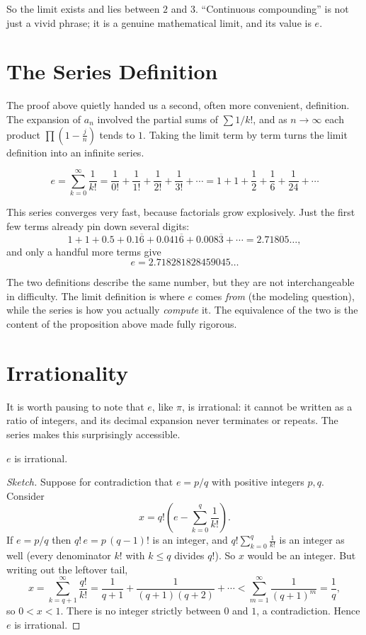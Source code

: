 \documentclass{essay}
\begin{document}
So the limit exists and lies between \(2\) and \(3\). ``Continuous compounding'' is not just a vivid phrase; it is a genuine mathematical limit, and its value is \(e\).

\section{The Series Definition}

The proof above quietly handed us a second, often more convenient, definition. The expansion of \(a_{n}\) involved the partial sums of \(\sum 1/k!\), and as \(n \to \infty\) each product \(\prod\left(1 - \tfrac{j}{n}\right)\) tends to \(1\). Taking the limit term by term turns the limit definition into an infinite series.

\begin{definition}
  \[ e = \sum_{k=0}^{\infty} \frac{1}{k!} = \frac{1}{0!} + \frac{1}{1!} + \frac{1}{2!} + \frac{1}{3!} + \cdots = 1 + 1 + \frac{1}{2} + \frac{1}{6} + \frac{1}{24} + \cdots \]
\end{definition}

This series converges very fast, because factorials grow explosively. Just the first few terms already pin down several digits:
\[ 1 + 1 + 0.5 + 0.1\overline{6} + 0.041\overline{6} + 0.008\overline{3} + \cdots = 2.71805\ldots, \]
and only a handful more terms give
\[ e = 2.718281828459045\ldots \]

The two definitions describe the same number, but they are not interchangeable in difficulty. The limit definition is where \(e\) comes \emph{from} (the modeling question), while the series is how you actually \emph{compute} it. The equivalence of the two is the content of the proposition above made fully rigorous.

\section{Irrationality}

It is worth pausing to note that \(e\), like \(\pi\), is irrational: it cannot be written as a ratio of integers, and its decimal expansion never terminates or repeats. The series makes this surprisingly accessible.

\begin{theorem}
  \(e\) is irrational.
\end{theorem}

\begin{proof}[Sketch]
  Suppose for contradiction that \(e = p/q\) with positive integers \(p, q\). Consider
  \[ x = q!\left(e - \sum_{k=0}^{q}\frac{1}{k!}\right). \]
  If \(e = p/q\) then \(q!\,e = p\,(q-1)!\) is an integer, and \(q!\sum_{k=0}^{q}\tfrac{1}{k!}\) is an integer as well (every denominator \(k!\) with \(k \le q\) divides \(q!\)). So \(x\) would be an integer. But writing out the leftover tail,
  \[ x = \sum_{k=q+1}^{\infty}\frac{q!}{k!} = \frac{1}{q+1} + \frac{1}{(q+1)(q+2)} + \cdots < \sum_{m=1}^{\infty}\frac{1}{(q+1)^{m}} = \frac{1}{q}, \]
  so \(0 < x < 1\). There is no integer strictly between \(0\) and \(1\), a contradiction. Hence \(e\) is irrational.
\end{proof}
\end{document}

